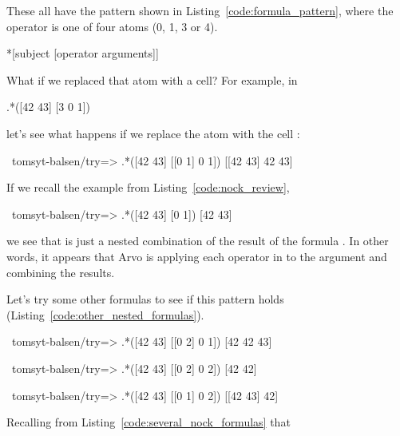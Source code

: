 These all have the pattern shown in Listing~\ref{code:formula_pattern}, where the operator is one of four atoms (0, 1, 3 or 4).

\begin{codelisting}
\label{code:formula_pattern}
\codecaption{}
\begin{code}
*[subject [operator arguments]]
\end{code}
\end{codelisting}

What if we replaced that atom with a cell? For example, in

\begin{code}
.*([42 43] [3 0 1])
\end{code}

let's see what happens if we replace the atom  with the cell \kode{[0 1]}:

\begin{code}
~tomsyt-balsen/try=> .*([42 43] [[0 1] 0 1])
[[42 43] 42 43]
\end{code}

If we recall the  example from Listing~\ref{code:nock_review},

\begin{code}
~tomsyt-balsen/try=> .*([42 43] [0 1])
[42 43]
\end{code}

we see that  is just a nested combination of the result of the formula . In other words, it appears that Arvo is applying each operator in \kode{[[0 1] 0 1]} to the argument \kode{[42 43]} and combining the results.

Let's try some other formulas to see if this pattern holds (Listing~\ref{code:other_nested_formulas}).

\begin{codelisting}
\label{code:other_nested_formulas}
\begin{code}
~tomsyt-balsen/try=> .*([42 43] [[0 2] 0 1])
[42 42 43]

~tomsyt-balsen/try=> .*([42 43] [[0 2] 0 2])
[42 42]

~tomsyt-balsen/try=> .*([42 43] [[0 1] 0 2])
[[42 43] 42]
\end{code}
\end{codelisting}

Recalling from Listing~\ref{code:several_nock_formulas} that

